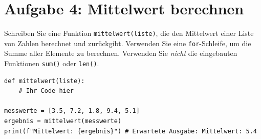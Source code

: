 \documentclass[ngerman,10pt]{article}
\begin{document}
\section*{Aufgabe 4: Mittelwert berechnen}
Schreiben Sie eine Funktion \texttt{mittelwert(liste)}, die den Mittelwert einer Liste von Zahlen berechnet und zurückgibt. Verwenden Sie eine \texttt{for}-Schleife, um die Summe aller Elemente zu berechnen. Verwenden Sie \emph{nicht} die eingebauten Funktionen \texttt{sum()} oder \texttt{len()}.

\begin{lstlisting}
def mittelwert(liste):
    # Ihr Code hier

messwerte = [3.5, 7.2, 1.8, 9.4, 5.1]
ergebnis = mittelwert(messwerte)
print(f"Mittelwert: {ergebnis}") # Erwartete Ausgabe: Mittelwert: 5.4
\end{lstlisting}
\end{document}
